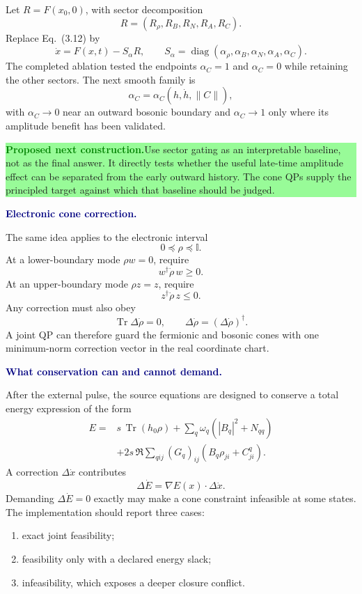\documentclass[10pt]{article}
\newcommand{\Tr}{\operatorname{Tr}}
\newcommand{\I}{\mathbb I}
\newcommand{\proposalbox}[1]{%
  \par\medskip
  \noindent\colorbox{palegreen}{%
    \parbox{\dimexpr\linewidth-2\fboxsep\relax}{%
      \textcolor{green}{\textbf{Proposed next construction.}}\quad #1%
    }%
  }\par\medskip
}
\newcommand{\flowlead}[1]{%
  \par\medskip
  \needspace{3\baselineskip}%
  \noindent\textcolor{navy}{\textbf{#1.}}\enspace\ignorespaces
}
\begin{document}
Let \(R=F(x_0,0)\), with sector decomposition
\[
R=(R_\rho,R_B,R_N,R_A,R_C).
\tag{6.16}
\]
Replace Eq.~(3.12) by
\[
\dot x=F(x,t)-S_\alpha R,
\qquad
S_\alpha=\operatorname{diag}
(\alpha_\rho,\alpha_B,\alpha_N,\alpha_A,\alpha_C).
\tag{6.17}
\]
The completed ablation tested the endpoints \(\alpha_C=1\) and
\(\alpha_C=0\) while retaining the other sectors.  The next smooth family is
\[
\alpha_C=\alpha_C(h,\dot h,\lVert C\rVert),
\tag{6.18}
\]
with \(\alpha_C\to0\) near an outward bosonic boundary and
\(\alpha_C\to1\) only where its amplitude benefit has been validated.

\proposalbox{Use sector gating as an interpretable baseline, not as the final
answer.  It directly tests whether the useful late-time amplitude effect can
be separated from the early outward history.  The cone QPs supply the
principled target against which that baseline should be judged.}

\flowlead{Electronic cone correction}

The same idea applies to the electronic interval
\[
0\preceq\rho\preceq\I.
\tag{6.19}
\]
At a lower-boundary mode \(\rho w=0\), require
\[
w^\dagger\dot\rho\,w\geq0.
\tag{6.20}
\]
At an upper-boundary mode \(\rho z=z\), require
\[
z^\dagger\dot\rho\,z\leq0.
\tag{6.21}
\]
Any correction must also obey
\[
\Tr\Delta\dot\rho=0,\qquad
\Delta\dot\rho=(\Delta\dot\rho)^\dagger.
\tag{6.22}
\]
A joint QP can therefore guard the fermionic and bosonic cones with one
minimum-norm correction vector in the real coordinate chart.

\flowlead{What conservation can and cannot demand}

After the external pulse, the source equations are designed to conserve a
total energy expression of the form
\[
\begin{aligned}
E={}&s\,\Tr(h_0\rho)
+\sum_q\omega_q\left(|B_q|^2+N_{qq}\right)\\
&+2s\,\Re\sum_{qij}(G_q)_{ij}
\left(B_q\rho_{ji}+C^q_{ji}\right).
\end{aligned}
\tag{6.23}
\]
A correction \(\Delta\dot x\) contributes
\[
\Delta\dot E=\nabla E(x)\cdot\Delta\dot x.
\tag{6.24}
\]
Demanding \(\Delta\dot E=0\) exactly may make a cone constraint infeasible at
some states.  The implementation should report three cases:
\begin{enumerate}
  \item exact joint feasibility;
  \item feasibility only with a declared energy slack;
  \item infeasibility, which exposes a deeper closure conflict.
\end{enumerate}
\end{document}
